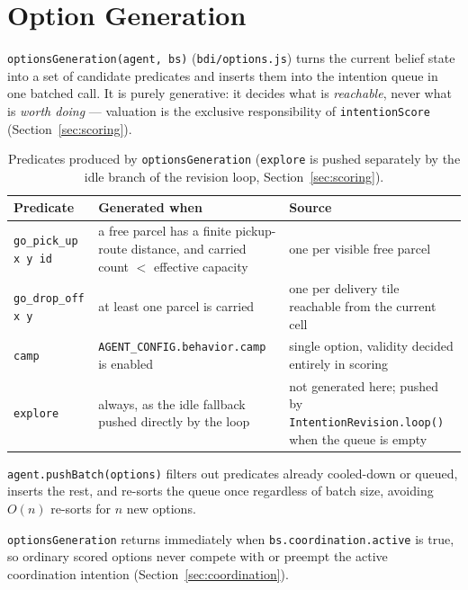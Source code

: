 \documentclass[11pt,a4paper]{article}
\begin{document}
\section{Option Generation}
\label{sec:options}

\texttt{optionsGeneration(agent, bs)} (\texttt{bdi/options.js}) turns the current belief state
into a set of candidate predicates and inserts them into the intention queue in one batched
call. It is purely generative: it decides what is \emph{reachable}, never what is
\emph{worth doing} --- valuation is the exclusive responsibility of \texttt{intentionScore}
(Section~\ref{sec:scoring}).
\begin{table}[htbp]
\centering
\footnotesize
\begin{tabular}{@{}p{2.6cm}p{4.3cm}p{5.6cm}@{}}
\toprule
\textbf{Predicate} & \textbf{Generated when} & \textbf{Source} \\
\midrule
\texttt{go\_pick\_up x y id} & a free parcel has a finite pickup-route distance, and carried count $<$ effective capacity & one per visible free parcel \\
\texttt{go\_drop\_off x y} & at least one parcel is carried & one per delivery tile reachable from the current cell \\
\texttt{camp} & \texttt{AGENT\_CONFIG.behavior.camp} is enabled & single option, validity decided entirely in scoring \\
\texttt{explore} & always, as the idle fallback pushed directly by the loop & not generated here; pushed by \texttt{IntentionRevision.loop()} when the queue is empty \\
\bottomrule
\end{tabular}
\caption{Predicates produced by \texttt{optionsGeneration} (\texttt{explore} is pushed
separately by the idle branch of the revision loop, Section~\ref{sec:scoring}).}
\label{tab:options}
\end{table}

\texttt{agent.pushBatch(options)} filters out predicates already cooled-down or queued, inserts
the rest, and re-sorts the queue once regardless of batch size, avoiding $O(n)$ re-sorts for $n$
new options.

\texttt{optionsGeneration} returns immediately when \texttt{bs.coordination.active} is true, so
ordinary scored options never compete with or preempt the active coordination intention
(Section~\ref{sec:coordination}).

\end{document}
